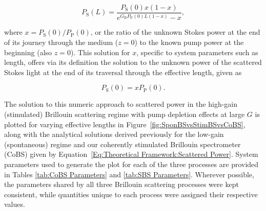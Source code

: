 \begin{equation}
  P_{\mathrm{S}}(L) = \frac{P_{\mathrm{S}}(0)x(1 - x)}{e^{G_{\mathrm{B}}P_{\mathrm{P}}(0)L(1 - x)} - x},
\end{equation}

where \(x = P_{\mathrm{S}}(0)/P_{\mathrm{P}}(0)\), or the ratio of the unknown Stokes power at the end of its journey through the medium (\(z=0\)) to the known pump power at the beginning (also \(z=0\)). This solution for \(x\), specific to system parameters such as length, offers via its definition the solution to the unknown power of the scattered Stokes light at the end of its traversal through the effective length, given as

\begin{equation}
  P_{\mathrm{S}}(0) = xP_{\mathrm{P}}(0).
\end{equation}

The solution to this numeric approach to scattered power in the high-gain (stimulated) Brillouin scattering regime with pump depletion effects at large \(G\) is plotted for varying effective lengths in Figure~\ref{fig:SponBSvsStimBSvsCoBS}, along with the analytical solutions derived previously for the low-gain (spontaneous) regime and our coherently stimulated Brillouin spectrometer (\acs{CoBS}) given by Equation~\ref{Eq:Theoretical Framework:Scattered Power}. System parameters used to generate the plot for each of the three processes are provided in Tables \ref{tab:CoBS Parameters} and \ref{tab:SBS Parameters}. Wherever possible, the parameters shared by all three Brillouin scattering processes were kept consistent, while quantities unique to each process were assigned their respective values.

